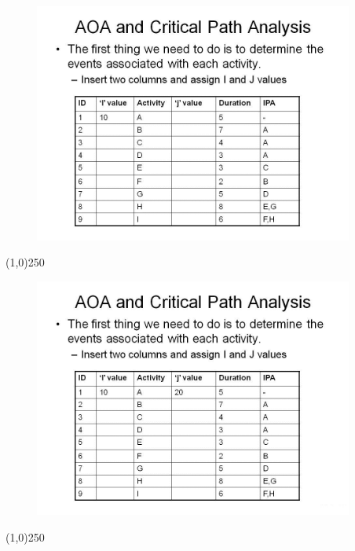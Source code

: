 \begin{frame}
\begin{figure}
	\centering
		\includegraphics[width = 10.5cm]{oldnotes/Slide62.jpg}
\end{figure}
\end{frame}
\begin{center}\line(1,0){250}\end{center}


\begin{frame}
\begin{figure}
	\centering
		\includegraphics[width = 10.5cm]{oldnotes/Slide63.jpg}
\end{figure}
\end{frame}
\begin{center}\line(1,0){250}\end{center}


